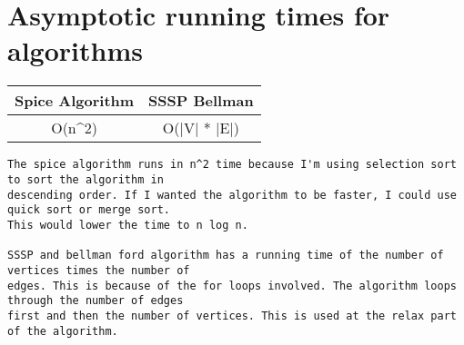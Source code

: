 \documentclass{article}
\begin{document}
\section{Asymptotic running times for algorithms}
\begin{center}
\begin{tabular}{||c c||} 
 \hline
Spice Algorithm & SSSP Bellman\\[0.10ex] 
 \hline \hline
 O(n^2) & O(|V| * |E|)\\
 \hline
\end{tabular}
\end{center}
\begin{lstlisting}
The spice algorithm runs in n^2 time because I'm using selection sort to sort the algorithm in 
descending order. If I wanted the algorithm to be faster, I could use quick sort or merge sort. 
This would lower the time to n log n.

SSSP and bellman ford algorithm has a running time of the number of vertices times the number of 
edges. This is because of the for loops involved. The algorithm loops through the number of edges 
first and then the number of vertices. This is used at the relax part of the algorithm.
\end{lstlisting}
\end{document}
